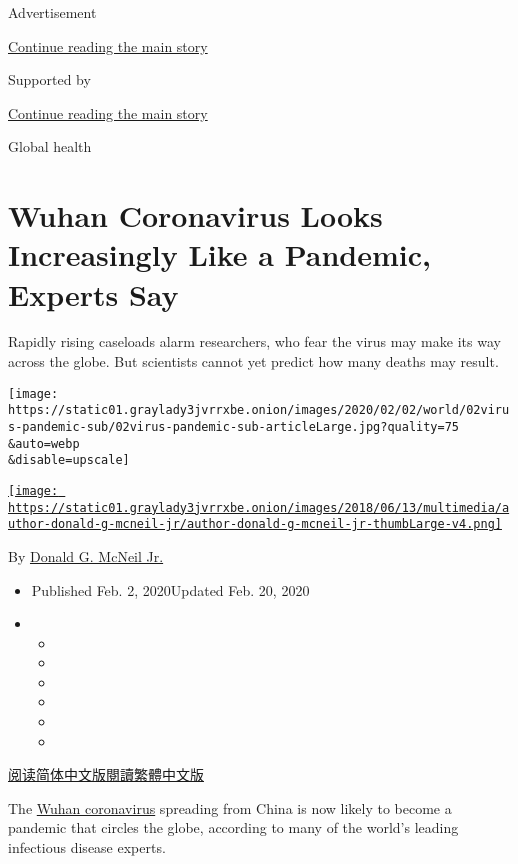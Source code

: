 Advertisement

\protect\hyperlink{after-top}{Continue reading the main story}

Supported by

\protect\hyperlink{after-sponsor}{Continue reading the main story}

Global health

\hypertarget{wuhan-coronavirus-looks-increasingly-like-a-pandemic-experts-say}{%
\section{Wuhan Coronavirus Looks Increasingly Like a Pandemic, Experts
Say}\label{wuhan-coronavirus-looks-increasingly-like-a-pandemic-experts-say}}

Rapidly rising caseloads alarm researchers, who fear the virus may make
its way across the globe. But scientists cannot yet predict how many
deaths may result.

\texttt{[image: https://static01.graylady3jvrrxbe.onion/images/2020/02/02/world/02virus-pandemic-sub/02virus-pandemic-sub-articleLarge.jpg?quality=75\\\&auto=webp\\\&disable=upscale]}

\href{https://www.nytimes3xbfgragh.onion/by/donald-g-mcneil-jr}{\texttt{[image: https://static01.graylady3jvrrxbe.onion/images/2018/06/13/multimedia/author-donald-g-mcneil-jr/author-donald-g-mcneil-jr-thumbLarge-v4.png]}}

By
\href{https://www.nytimes3xbfgragh.onion/by/donald-g-mcneil-jr}{Donald
G. McNeil Jr.}

\begin{itemize}
\item
  Published Feb. 2, 2020Updated Feb. 20, 2020
\item
  \begin{itemize}
  \item
  \item
  \item
  \item
  \item
  \item
  \end{itemize}
\end{itemize}

\href{https://cn.nytimes3xbfgragh.onion/china/20200203/coronavirus-pandemic-china/}{阅读简体中文版}\href{https://cn.nytimes3xbfgragh.onion/china/20200203/coronavirus-pandemic-china/zh-hant/}{閱讀繁體中文版}

The
\href{https://www.nytimes3xbfgragh.onion/2020/02/20/world/asia/japan-coronavirus-clusters.html}{Wuhan
coronavirus} spreading from China is now likely to become a pandemic
that circles the globe, according to many of the world's leading
infectious disease experts.

